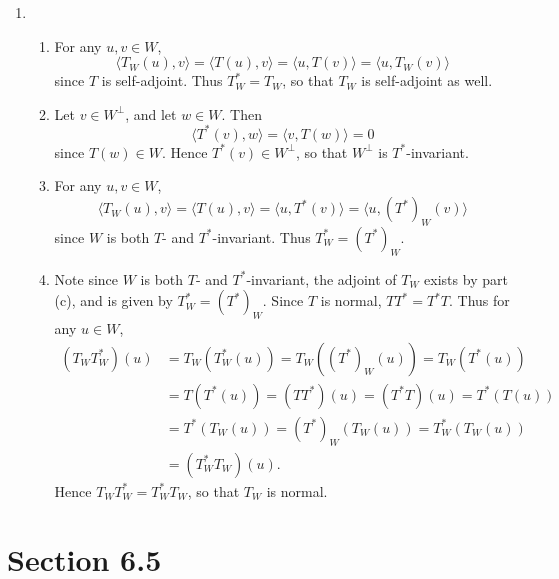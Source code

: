 \documentclass[12pt]{article}
\begin{document}
\begin{enumerate}
\begin{enumerate}
\end{enumerate}

\item
\begin{enumerate}
\item
For any $u, v \in W$,
\begin{equation*}
\langle T_W(u), v \rangle = \langle T(u), v \rangle = \langle u, T(v) \rangle = \langle u, T_W(v) \rangle
\end{equation*}
since $T$ is self-adjoint. Thus $T_W^* = T_W$, so that $T_W$ is self-adjoint as well.

\item
Let $v \in W^\bot$, and let $w \in W$. Then
\begin{equation*}
\langle T^*(v), w \rangle = \langle v, T(w) \rangle = 0
\end{equation*}
since $T(w) \in W$. Hence $T^*(v) \in W^\bot$, so that $W^\bot$ is $T^*$-invariant.

\item
For any $u, v \in W$,
\begin{equation*}
\langle T_W(u), v \rangle = \langle T(u), v \rangle = \langle u, T^*(v) \rangle = \langle u, (T^*)_W(v) \rangle
\end{equation*}
since $W$ is both $T$- and $T^*$-invariant. Thus $T_W^* = (T^*)_W$.

\item
Note since $W$ is both $T$- and $T^*$-invariant, the adjoint of $T_W$ exists by part (c), and is given by $T_W^* = (T^*)_W$. Since $T$ is normal, $TT^* = T^*T$. Thus for any $u \in W$,
\begin{align*}
(T_W T_W^*)(u) &= T_W(T_W^*(u)) = T_W((T^*)_W(u)) = T_W(T^*(u)) \\
&= T(T^*(u)) = (TT^*)(u) = (T^*T)(u) = T^*(T(u)) \\
&= T^*(T_W(u)) = (T^*)_W(T_W(u)) = T_W^*(T_W(u)) \\
&= (T_W^*T_W)(u).
\end{align*}
Hence $T_W T_W^* = T_W^* T_W$, so that $T_W$ is normal.

\end{enumerate}

\end{enumerate}
\fi

\section*{Section 6.5}
\end{document}
